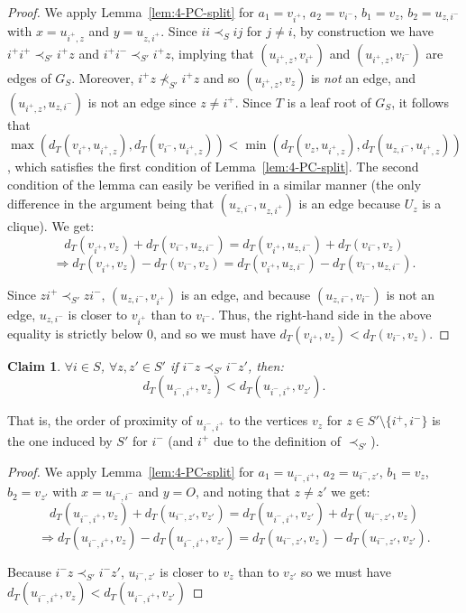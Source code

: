 \documentclass[11pt, letter]{article}
\newtheorem{claim}[theorem]{Claim}
\theoremstyle{remark}
\begin{document}
\begin{proof}
    We apply Lemma~\ref{lem:4-PC-split} for $a_1=v_{i^+}$, $a_2=v_{i^-}$, $b_1=v_{z}$, $b_2=u_{z,i^-}$ with $x=u_{i^+,z}$ and $y=u_{z,i^+}$. 
    Since $ii \prec_S ij$ for $j \neq i$, by construction we have $i^+ i^+ \prec_{S'} i^+ z$ and $i^+ i^- \prec_{S'} i^+ z$, implying that $(u_{i^+, z}, v_{i^+})$ and $(u_{i^+, z}, v_{i^-})$ are edges of $G_S$.  Moreover, $i^+ z \not \prec_{S'} i^+z$ and so $(u_{i^+,z}, v_z)$ is \emph{not} an edge, and $(u_{i^+,z},u_{z,i^-})$ is not an edge since $z \neq i^+$.  Since $T$ is a leaf root of $G_S$, it follows that $\max(d_T(v_{i^+}, u_{i^+,z}), d_T(v_{i^-}, u_{i^+,z})) < \min(d_T(v_z, u_{i^+,z}), d_T(u_{z,i^-}, u_{i^+,z}))$, which satisfies the first condition of Lemma~\ref{lem:4-PC-split}.  The second condition of the lemma can easily be verified in a similar manner (the only difference in the argument being that $(u_{z,i^-}, u_{z,i^+})$ is an edge because $U_z$ is a clique).
    We get:
    $$d_T(v_{i^+},v_{z})+d_T(v_{i^-},u_{z,i^-})=d_T(v_{i^+},u_{z,i^-})+d_T(v_{i^-},v_{z})$$
    $$\Longrightarrow d_T(v_{i^+},v_{z})-d_T(v_{i^-},v_{z})=d_T(v_{i^+},u_{z,i^-})-d_T(v_{i^-},u_{z,i^-}).$$

    Since $zi^+ \prec_{S'} zi^-$, $(u_{z,i^-},v_{i^+})$ is an edge, and because $(u_{z,i^-},v_{i^-})$ is not an edge, 
    $u_{z,i^-}$ is closer to $v_{i^+}$ than to $v_{i^-}$.  Thus, the right-hand side in the above equality is strictly below $0$, and so we must have $d_T(v_{i^+}, v_z)<d_T(v_{i^-}, v_z)$.
\end{proof}

\begin{claim}
    \label{claim 2}
    $\forall i\in S$, $\forall z,z'\in S'$ if $i^-z\prec_{S'} i^-z'$, then: 
    $$d_T(u_{i^-,i^+},v_z)<d_T(u_{i^-,i^+},v_{z'}).$$
\end{claim}

That is, the order of proximity of $u_{i^-,i^+}$ to the vertices $v_z$ for $z\in S'\setminus \{i^+,i^-\}$ is the one induced by $S'$ for $i^-$ (and $i^+$ due to the definition of $\prec_{S'}$).
\begin{proof}
    We apply Lemma~\ref{lem:4-PC-split} for $a_1=u_{i^-,i^+}$, $a_2=u_{i^-,z'}$, $b_1=v_z$, $b_2=v_{z'}$ with $x=u_{i^-,i^-}$ and $y=O$, and noting that $z \neq z'$  we get:
    $$d_T(u_{i^-,i^+},v_z)+d_T(u_{i^-,z'},v_{z'})=d_T(u_{i^-,i^+},v_{z'})+d_T(u_{i^-,z'},v_z)$$
    $$\Longrightarrow d_T(u_{i^-,i^+},v_z)-d_T(u_{i^-,i^+},v_{z'})=d_T(u_{i^-,z'},v_z)-d_T(u_{i^-,z'},v_{z'}).$$

    Because $i^-z \prec_{S'} i^-z'$, $u_{i^-,z'}$ is closer to $v_z$ than to $v_{z'}$ so we must have $d_T(u_{i^-,i^+},v_z)<d_T(u_{i^-,i^+},v_{z'})$
\end{proof}
\end{document}
